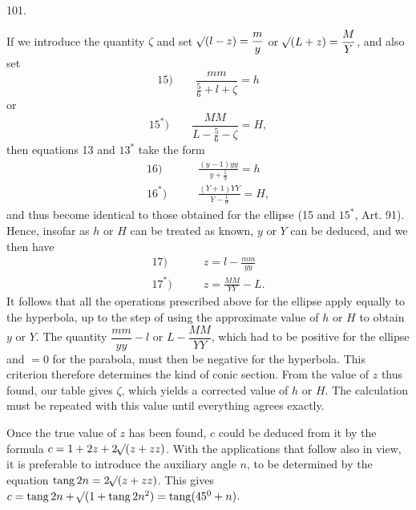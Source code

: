 \par{}\medskip
\hypertarget{native-141-article101}{}
\begin{center}101.\end{center}
If we introduce the quantity $\zeta$ and set $\mathord{{}^{}\!\surd}(l-z)=\dfrac my$ or $\mathord{{}^{}\!\surd}(L+z)=\dfrac MY$, and also set
\[
\mathrm{15)}\qquad\frac{mm}{\tfrac56+l+\zeta}=h
\]
\noindent or
\[
\mathrm{15^*)}\qquad\frac{MM}{L-\tfrac56-\zeta}=H,
\]
\noindent then equations 13 and $13^*$ take the form
\[
\begin{aligned}
\mathrm{16)}\qquad&\frac{(y-1)yy}{y+\tfrac19}=h\\[.6em]
\mathrm{16^*)}\qquad&\frac{(Y+1)YY}{Y-\tfrac19}=H,
\end{aligned}
\]
\noindent and thus become identical to those obtained for the ellipse (15 and $15^*$, Art. 91). Hence, insofar as $h$ or $H$ can be treated as known, $y$ or $Y$ can be deduced, and we then have
\[
\begin{aligned}
\mathrm{17)}\qquad&z=l-\frac{mm}{yy}\\[.6em]
\mathrm{17^*)}\qquad&z=\frac{MM}{YY}-L.
\end{aligned}
\]
\noindent It follows that all the operations prescribed above for the ellipse apply equally to the hyperbola, up to the step of using the approximate value of $h$ or $H$ to obtain $y$ or $Y$. The quantity $\dfrac{mm}{yy}-l$ or $L-\dfrac{MM}{YY}$, which had to be positive for the ellipse and $=0$ for the parabola, must then be negative for the hyperbola. This criterion therefore determines the kind of conic section. From the value of $z$ thus found, our table gives $\zeta$, which yields a corrected value of $h$ or $H$. The calculation must be repeated with this value until everything agrees exactly.
\par
Once the true value of $z$ has been found, $c$ could be deduced from it by the formula $c=1+2z+2\mathord{{}^{}\!\surd}(z+zz)$. With the applications that follow also in view, it is preferable to introduce the auxiliary angle $n$, to be determined by the equation $\operatorname{tang}2n=2\mathord{{}^{}\!\surd}(z+zz)$. This gives $c=\operatorname{tang}2n+\mathord{{}^{}\!\surd}(1+\operatorname{tang}2n^2)=\operatorname{tang}(45^0+n)$.
